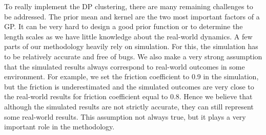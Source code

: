 To really implement the DP clustering, there are many remaining challenges to be addressed.
The prior mean and kernel are the two most important factors of a GP.
It can be very hard to design a good prior function or to determine the length scales as we have little knowledge about the real-world dynamics.
A few parts of our methodology heavily rely on simulation.
For this, the simulation has to be relatively accurate and free of bugs.
We also make a very strong assumption that the simulated results always correspond to real-world outcomes in some environment. 
For example, we set the friction coefficient to 0.9 in the simulation, but the friction is underestimated and the simulated outcomes are very close to the real-world results for friction coefficient equal to 0.8.
Hence we believe that although the simulated results are not strictly accurate, they can still represent some real-world results.
This assumption not always true, but it plays a very important role in the methodology.



